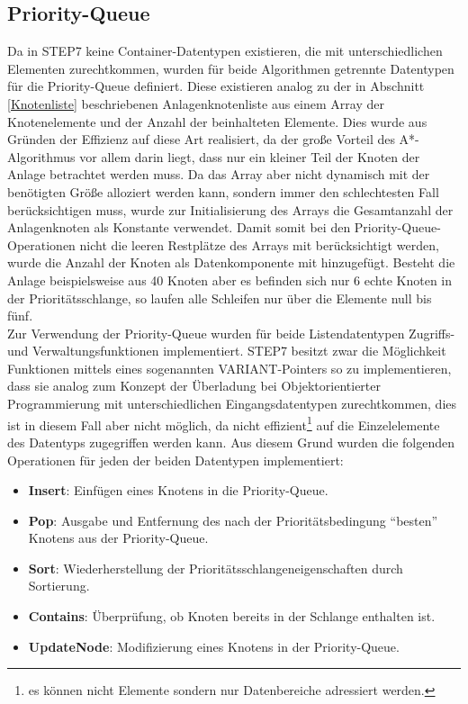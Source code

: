 		\subsection{Priority-Queue}
		
			Da in \ac{STEP7} keine Container-Datentypen existieren, die mit unterschiedlichen Elementen zurechtkommen, wurden für beide Algorithmen getrennte Datentypen für die Priority-Queue definiert. Diese existieren analog zu der in Abschnitt \ref{Knotenliste} beschriebenen Anlagenknotenliste aus einem Array der Knotenelemente und der Anzahl der beinhalteten Elemente. Dies wurde aus Gründen der Effizienz auf diese Art realisiert, da der große Vorteil des A*-Algorithmus vor allem darin liegt, dass nur ein kleiner Teil der Knoten der Anlage betrachtet werden muss. Da das Array aber nicht dynamisch mit der benötigten Größe alloziert werden kann, sondern immer den schlechtesten Fall berücksichtigen muss, wurde zur Initialisierung des Arrays die Gesamtanzahl der Anlagenknoten als Konstante verwendet. Damit somit bei den Priority-Queue-Operationen nicht die leeren Restplätze des Arrays mit berücksichtigt werden, wurde die Anzahl der Knoten als Datenkomponente mit hinzugefügt. Besteht die Anlage beispielsweise aus 40 Knoten aber es befinden sich nur 6 echte Knoten in der Prioritätsschlange, so laufen alle Schleifen nur über die Elemente null bis fünf.
			\\
			Zur Verwendung der Priority-Queue wurden für beide Listendatentypen Zugriffs- und Verwaltungsfunktionen implementiert. \ac{STEP7} besitzt zwar die Möglichkeit Funktionen mittels eines sogenannten VARIANT-Pointers so zu implementieren, dass sie analog zum Konzept der Überladung bei Objektorientierter Programmierung mit unterschiedlichen Eingangsdatentypen zurechtkommen\cite{STEP7Prog}, dies ist in diesem Fall aber nicht möglich, da nicht effizient\footnote{es können nicht Elemente sondern nur Datenbereiche adressiert werden.} auf die Einzelelemente des Datentyps zugegriffen werden kann. Aus diesem Grund wurden die folgenden Operationen für jeden der beiden Datentypen implementiert:
			
			\begin{itemize}
				\item \textbf{Insert}: Einfügen eines Knotens in die Priority-Queue.
				\item \textbf{Pop}: Ausgabe und Entfernung des nach der Prioritätsbedingung "`besten"' Knotens aus der Priority-Queue.
				\item \textbf{Sort}: Wiederherstellung der Prioritätsschlangeneigenschaften durch Sortierung.
				\item \textbf{Contains}: Überprüfung, ob Knoten bereits in der Schlange enthalten ist.
				\item \textbf{UpdateNode}: Modifizierung eines Knotens in der Priority-Queue.
			\end{itemize}
			
